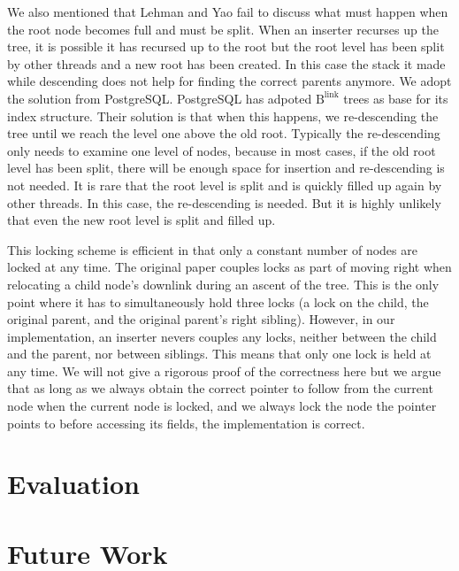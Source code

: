 \documentclass[twoside,11pt,openright]{report}
\theoremstyle{definition}
\begin{document}
We also mentioned that Lehman and Yao fail to discuss what must happen when the root node becomes full and must be split. When an inserter recurses up the tree, it is possible it has recursed up to the root but the root level has been split by other threads and a new root has been created. In this case the stack it made while descending does not help for finding the correct parents anymore. We adopt the solution from PostgreSQL. PostgreSQL has adpoted $\text{B}^{\text{link}}$ trees as base for its index structure. Their solution is that when this happens, we re-descending the tree until we reach the level one above the old root. Typically the re-descending only needs to examine one level of nodes, because in most cases, if the old root level has been split, there will be enough space for insertion and re-descending is not needed. It is rare that the root level is split and is quickly filled up again by other threads. In this case, the re-descending is needed. But it is highly unlikely that even the new root level is split and filled up.

This locking scheme is efficient in that only a constant number of nodes are locked at any time. The original paper couples locks as part of moving right when relocating a child node's downlink during an ascent of the tree.  This is the only point where it has to simultaneously hold three locks (a lock on the child, the original parent, and the original parent's right sibling). However, in our implementation, an inserter nevers couples any locks, neither between the child and the parent, nor between siblings. This means that only one lock is held at any time. We will not give a rigorous proof of the correctness here but we argue that as long as we always obtain the correct pointer to follow from the current node when the current node is locked, and we always lock the node the pointer points to before accessing its fields, the implementation is correct.


\chapter{Evaluation}
\label{ch:evaluation}


\chapter{Future Work}
\label{ch:future_work}
\end{document}
